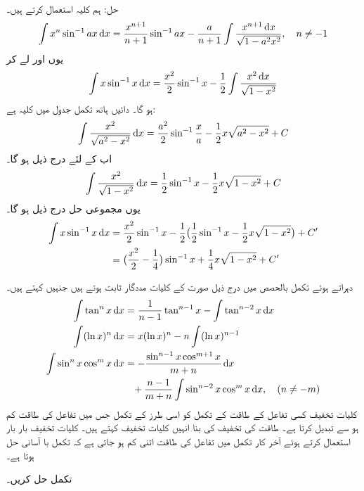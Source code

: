حل:\quad
ہم کلیہ  استعمال کرتے ہیں۔
\begin{align*}
\int x^n\sin^{-1}ax\dif x=\frac{x^{n+1}}{n+1}\sin^{-1}ax-\frac{a}{n+1}\int\frac{x^{n+1}\dif x}{\sqrt{1-a^2x^2}},\quad n\ne -1
\end{align*}
یوں  اور  لے کر
\begin{align*}
\int x\sin^{-1}x\dif x=\frac{x^2}{2}\sin^{-1}x-\frac{1}{2}\int\frac{x^2\dif x}{\sqrt{1-x^2}}
\end{align*}
ہو گا۔ دائیں ہاتھ تکمل جدول میں کلیہ  ہے:
\begin{align*}
\int \frac{x^2}{\sqrt{a^2-x^2}}\dif x=\frac{a^2}{2}\sin^{-1}\frac{x}{a}-\frac{1}{2}x\sqrt{a^2-x^2}+C
\end{align*}
اب  کے لئے درج ذیل ہو گا۔
\begin{align*}
\int \frac{x^2}{\sqrt{1-x^2}}\dif x=\frac{1}{2}\sin^{-1}x-\frac{1}{2}x\sqrt{1-x^2}+C
\end{align*}
یوں مجموعی حل درج ذیل ہو گا۔
\begin{align*}
\int x\sin^{-1}x\dif x&=\frac{x^2}{2}\sin^{-1}x-\frac{1}{2}\big(\frac{1}{2}\sin^{-1}x-\frac{1}{2}x\sqrt{1-x^2}\big)+C'\\
&=\big(\frac{x^2}{2}-\frac{1}{4}\big)\sin^{-1}x+\frac{1}{4}x\sqrt{1-x^2}+C'
\end{align*}

دہراتے ہوئے تکمل بالحصص میں درج ذیل صورت کے کلیات مددگار ثابت ہوتے ہیں جنہیں  کہتے ہیں۔
\begin{align}
\int \tan^n x\dif x&=\frac{1}{n-1}\tan^{n-1}x-\int \tan^{n-2}x\dif x\label{مساوات_طریقہ_کلیات_تخفیف_الف}\\
\int(\ln x)^n\dif x&=x(\ln x)^n-n\int(\ln x)^{n-1}\label{مساوات_طریقہ_کلیات_تخفیف_ب}\\
\int\sin^nx\cos^mx\dif x&=-\frac{\sin^{n-1}x\cos^{m+1}x}{m+n}\dif x\nonumber\\
&\phantom{=}+\frac{n-1}{m+n}\int\sin^{n-2}x\cos^mx\dif x,\quad (n\ne -m)\label{مساوات_طریقہ_کلیات_تخفیف_پ}
\end{align}
کلیات تخفیف کسی تفاعل کے طاقت کے تکمل کو اسی طرز کے تکمل جس میں تفاعل کی طاقت کم ہو سے تبدیل کرتا ہے۔ طاقت کی تخفیف کی بنا انہیں کلیات تخفیف کہتے ہیں۔ کلیات تخفیف بار بار استعمال کرتے ہوئے آخر کار تکمل میں تفاعل کی طاقت اتنی کم ہو جاتی ہے کہ تکمل با آسانی حل ہوتا ہے۔

تکمل  حل کریں۔

